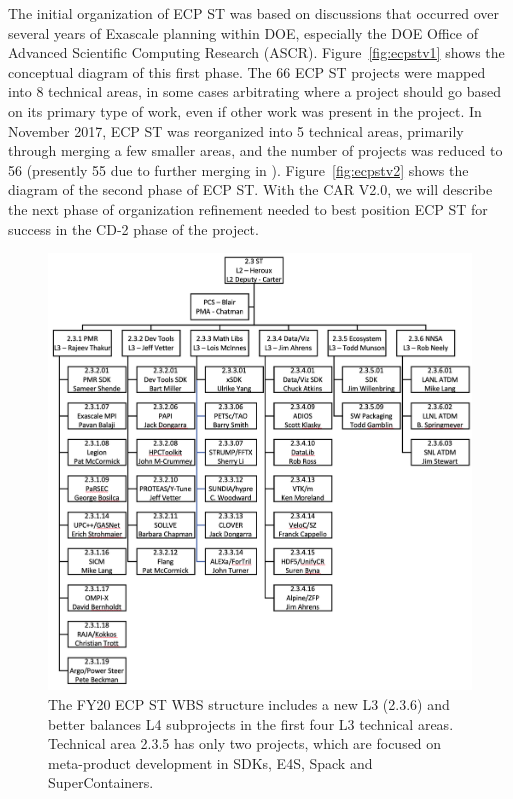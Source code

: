 The initial organization of ECP ST was based on discussions that occurred over several years of Exascale planning within DOE, especially the DOE Office of Advanced Scientific Computing Research (ASCR).  Figure~\ref{fig:ecpstv1} shows the conceptual diagram of this first phase.  The 66 ECP ST projects were mapped into 8 technical areas, in some cases arbitrating where a project should go based on its primary type of work, even if other work was present in the project.  In November 2017, ECP ST was reorganized into 5 technical areas, primarily through merging a few smaller areas, and the number of projects was reduced to 56 (presently 55 due to further merging in \ecosystem).  Figure~\ref{fig:ecpstv2} shows the diagram of the second phase of ECP ST.  With the CAR V2.0, we will describe the next phase of organization refinement needed to best position ECP ST for success in the CD-2 phase of the project.

\begin{figure}
	\centering
	\includegraphics[width=0.9\linewidth]{STFY20WBS}
	\caption{\label{fig:wbs-FY20} The FY20 ECP ST WBS structure includes a new L3 (2.3.6) and better balances L4 subprojects in the first four L3 technical areas.  Technical area 2.3.5 has only two projects, which are focused on meta-product development in SDKs, E4S, Spack and SuperContainers.}
\end{figure}

